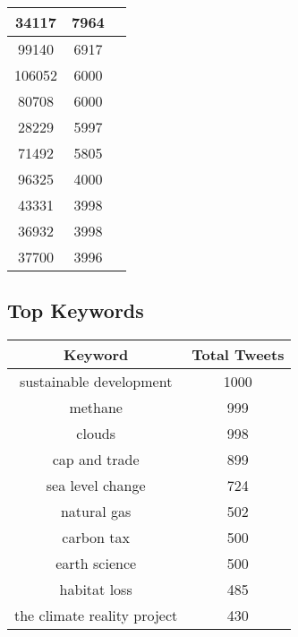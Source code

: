 \documentclass{article}\usepackage[T1]{fontenc}
\begin{document}
\begin{tabular}{|c|c|c|}
 \hline
34117 & 7964\\ 
 \hline
99140 & 6917\\ 
 \hline
106052 & 6000\\ 
 \hline
80708 & 6000\\ 
 \hline
28229 & 5997\\ 
 \hline
71492 & 5805\\ 
 \hline
96325 & 4000\\ 
 \hline
43331 & 3998\\ 
 \hline
36932 & 3998\\ 
 \hline
37700 & 3996\\ 
 \hline
\end{tabular}\subsection*{Top Keywords}\begin{tabular}{|c|c|}         \hline         Keyword & Total Tweets \\ 
 \hline
sustainable development & 1000\\ 
 \hline
methane & 999\\ 
 \hline
clouds & 998\\ 
 \hline
cap and trade & 899\\ 
 \hline
sea level change & 724\\ 
 \hline
natural gas & 502\\ 
 \hline
carbon tax & 500\\ 
 \hline
earth science & 500\\ 
 \hline
habitat loss & 485\\ 
 \hline
the climate reality project & 430\\ 
 \hline
\end{tabular}
\end{document}
